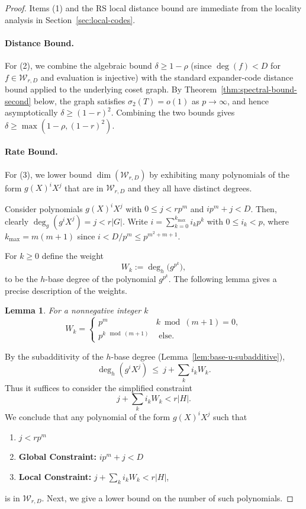 \documentclass[11pt]{article}
\theoremstyle{plain}
\newtheorem{lemma}[theorem]{Lemma}
\theoremstyle{definition}
\begin{document}
\begin{proof}
Items (1) and the RS local distance bound are immediate from the locality analysis in
Section~\ref{sec:local-codes}.

\paragraph{Distance Bound.}
For (2), we combine the algebraic bound $\delta\ge 1-\rho$ (since $\deg(f)<D$ for $f\in\mathcal W_{r,D}$ and evaluation is injective) with the standard expander-code distance bound applied to the underlying coset graph.
By Theorem~\ref{thm:spectral-bound-second} below, the graph satisfies $\sigma_2(T)=o(1)$ as $p\to\infty$, and hence asymptotically $\delta\ge (1-r)^2$.
Combining the two bounds gives $\delta \ge \max(1-\rho,(1-r)^2)$.
\paragraph{Rate Bound.}
 For (3), we lower bound $\dim(\mathcal W_{r,D})$ by exhibiting many  polynomials of the form 
$g(X)^iX^j$ that are in $\mathcal W_{r,D}$ and they  all have distinct degrees. 

Consider polynomials $g(X)^iX^j$ with $0\le j<rp^m$ and $ip^m+j<D$.
Then, clearly $\deg_g(g^iX^j)=j<r|G|$.
Write $i=\sum_{k=0}^{k_{\max}} i_k p^k$ with $0\le i_k<p$, where
$
k_{\max} = m(m+1)$ since $i< D/p^m \leq p^{m^2+m+1}$.

For $k\geq 0$ define the weight
\[
W_k:=\deg_h\!\big(g^{p^k}\big),
\] to be the $h$-base degree of the polynomial $g^{p^k}.$ The following lemma gives a precise description of the weights. 

\begin{lemma}
\label{lem:weights-second}
For a nonnegative integer  $k$ 
\[
W_k=
\begin{cases}
p^m & k \bmod (m+1) = 0,\\
p^{k\mod(m+1)} & \text{ else}.
\end{cases}
\]
\end{lemma}




By the subadditivity of the $h$-base degree (Lemma~\ref{lem:base-u-subadditive}),
\[
\deg_h(g^iX^j)\ \le\ j+\sum_k i_k W_k.
\]
Thus it suffices to consider the simplified constraint
\[
j+\sum_k i_k W_k < r|H|.
\]
We conclude that any polynomial of the form $g(X)^iX^j$ such that 
\begin{enumerate}
    \item $j<rp^m$ 
    \item \textbf{Global Constraint:} $ip^m+j<D$
    \item \textbf{Local Constraint:}  $j+\sum_k i_k W_k < r|H|$,
\end{enumerate}
is in $\mathcal{W}_{r,D}.$ Next, we give a lower bound on the number of such polynomials. 


\end{proof}
\end{document}
